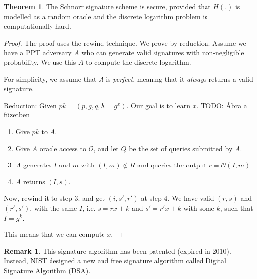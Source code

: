 \documentclass[11pt]{article}
\theoremstyle{definition}
\newtheorem{theorem}{Theorem}[section]
\newtheorem{remark}{Remark}[section]
\theoremstyle{proof}
\begin{document}
\begin{theorem}
	The Schnorr signature scheme is secure, provided that $H(.)$ is modelled as a random oracle and the discrete logarithm problem is computationally hard.
\end{theorem}

\begin{proof}
	The proof uses the rewind technique. We prove by reduction. Assume we have a PPT adversary $A$ who can generate valid signatures with non-negligible probability. We use this $A$ to compute the discrete logarithm.
	
	For simplicity, we assume that $A$ is \emph{perfect}, meaning that it \emph{always} returns a valid signature.
	
	\noindent Reduction: Given $pk = (p, g, q, h = g^x)$. Our goal is to learn $x$. TODO: Ábra a füzetben
	
	\begin{enumerate}
		\item Give $pk$ to $A$.
		\item Give $A$ oracle access to $\mathcal{O}$, and let $Q$ be the set of queries submitted by $A$.
		\item $A$ generates $I$ and $m$ with $(I, m) \not \in R$ and queries the output $r = \mathcal{O}(I, m)$.
		\item $A$ returns $(I, s)$.
	\end{enumerate}
	
	Now, rewind it to step 3. and get $(i, s', r')$ at step 4. We have valid $(r, s)$ and $(r', s')$, with the same $I$, i.e. $s = rx + k$ and $s' = r'x + k$ with some $k$, such that $I = g^k$.
	
	This means that we can compute $x$.
\end{proof}

\begin{remark}
	This signature algorithm has been patented (expired in 2010). Instead, NIST designed a new and free signature algorithm called Digital Signature Algorithm (DSA).
\end{remark}
\end{document}
